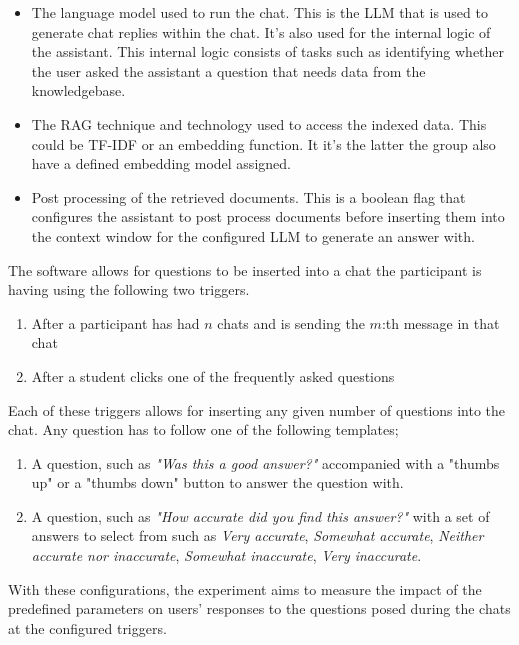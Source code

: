 \begin{itemize}
        \item The language model used to run the chat. This is the \gls{LLM} that is used to generate chat replies within the chat. It’s also used for the internal logic of the assistant. This internal logic consists of tasks such as identifying whether the user asked the assistant a question that needs data from the knowledgebase.
        \item The \gls{RAG} technique and technology used to access the indexed data. This could be \gls{TF-IDF} or an embedding function. It it’s the latter the group also have a defined embedding model assigned.
        \item Post processing of the retrieved documents. This is a boolean flag that configures the assistant to post process documents before inserting them into the context window for the configured \gls{LLM} to generate an answer with.
\end{itemize}


The software allows for questions to be inserted into a chat the participant is having using the following two triggers.


\begin{enumerate}
        \item After a participant has had $n$ chats and is sending the $m$:th message in that chat
        \item After a student clicks one of the frequently asked questions
\end{enumerate}


Each of these triggers allows for inserting any given number of questions into the chat. Any question has to follow one of the following templates;


\begin{enumerate}[label=\alph*)]
        \item A question, such as \textit{"Was this a good answer?"} accompanied with a "thumbs up" or a "thumbs down" button to answer the question with.
        \item A question, such as \textit{"How accurate did you find this answer?"} with a set of answers to select from such as \textit{Very accurate}, \textit{Somewhat accurate}, \textit{Neither accurate nor inaccurate}, \textit{Somewhat inaccurate}, \textit{Very inaccurate}.
\end{enumerate}


With these configurations, the experiment aims to measure the impact of the predefined parameters on users' responses to the questions posed during the chats at the configured triggers.


